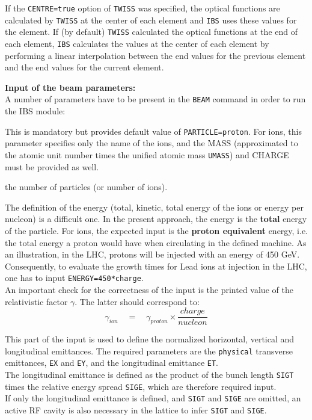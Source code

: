If the \texttt{CENTRE=true} option of \texttt{TWISS} was specified,
the optical functions are calculated by \texttt{TWISS} at the center of 
each element and \texttt{IBS} uses these values for the element. 
If (by default) \texttt{TWISS} calculated the optical functions at the end
of each element, \texttt{IBS} calculates the values at the center of
each element by performing a linear interpolation between the end values
for the previous element and the end values for the current element.

  
\textbf{Input of the beam parameters:}\\
A number of parameters have to be present in the  \texttt{BEAM} command
in order to run the IBS module: 

\begin{madlist}
   This is mandatory but \madx provides default
  value of \texttt{PARTICLE=proton}. For ions, this parameter specifies
  only the name of the ions, and the MASS (approximated to the atomic
  unit number times the unified atomic mass \texttt{UMASS}) and CHARGE must be
  provided as well.

   the number of particles (or number of ions).

   The definition of the energy (total, kinetic, total
  energy of the ions or energy per nucleon) is a difficult one. In the
  present approach, the energy is the \textbf{total} energy of the
  particle. For ions, the expected input is the \textbf{proton
    equivalent} energy, i.e. the total energy a proton would have when
  circulating in the defined machine. As an illustration, in the LHC,
  protons will be injected with an energy of 450 GeV. Consequently, to
  evaluate the growth times for Lead ions at injection in the LHC, one
  has to input \texttt{ENERGY=450*charge}. \\
  An important check for the correctness of the input is the printed value
  of the relativistic factor  $\gamma$. The latter should correspond to:   
  \[
  \gamma_{ion} \quad = \quad \gamma_{proton} \times \frac{charge}{nucleon}
  \]

   This part of the input is used to define the
  normalized horizontal, vertical and longitudinal emittances. 
  The required parameters are the \texttt{physical} transverse
  emittances, \texttt{EX} and \texttt{EY}, and the longitudinal
  emittance \texttt{ET}.\\  
  The longitudinal emittance is defined  as the product of the bunch
  length \texttt{SIGT} times the relative energy spread \texttt{SIGE},
  which are therefore required input. \\  
  If only the longitudinal emittance is defined, and \texttt{SIGT}
  and \texttt{SIGE} are omitted, an active RF cavity is also
  necessary in the lattice to infer \texttt{SIGT} and \texttt{SIGE}.

\end{madlist}


